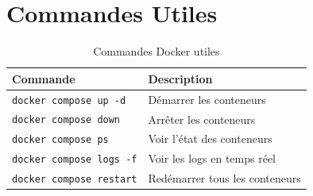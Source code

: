 \section{Commandes Utiles}

\begin{table}[H]
\centering
\caption{Commandes Docker utiles}
\label{tab:docker-commands}
\begin{tabular}{|l|p{8cm}|}
\hline
\textbf{Commande} & \textbf{Description} \\
\hline
\texttt{docker compose up -d} & Démarrer les conteneurs \\
\hline
\texttt{docker compose down} & Arrêter les conteneurs \\
\hline
\texttt{docker compose ps} & Voir l'état des conteneurs \\
\hline
\texttt{docker compose logs -f} & Voir les logs en temps réel \\
\hline
\texttt{docker compose restart} & Redémarrer tous les conteneurs \\
\hline
\end{tabular}
\end{table}
